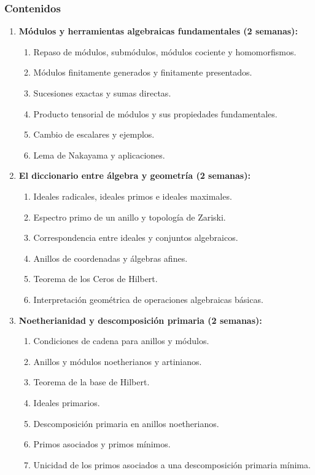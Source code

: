 \begin{refsection}
\subsubsection*{Contenidos}

\begin{enumerate}

\item \textbf{Módulos y herramientas algebraicas fundamentales (2 semanas):}
\begin{enumerate}
    \item Repaso de módulos, submódulos, módulos cociente y homomorfismos.
    \item Módulos finitamente generados y finitamente presentados.
    \item Sucesiones exactas y sumas directas.
    \item Producto tensorial de módulos y sus propiedades fundamentales.
    \item Cambio de escalares y ejemplos.
    \item Lema de Nakayama y aplicaciones.
\end{enumerate}

\item \textbf{El diccionario entre álgebra y geometría (2 semanas):}
\begin{enumerate}
    \item Ideales radicales, ideales primos e ideales maximales.
    \item Espectro primo de un anillo y topología de Zariski.
    \item Correspondencia entre ideales y conjuntos algebraicos.
    \item Anillos de coordenadas y álgebras afines.
    \item Teorema de los Ceros de Hilbert.
    \item Interpretación geométrica de operaciones algebraicas básicas.
\end{enumerate}

\item \textbf{Noetherianidad y descomposición primaria (2 semanas):}
\begin{enumerate}
    \item Condiciones de cadena para anillos y módulos.
    \item Anillos y módulos noetherianos y artinianos.
    \item Teorema de la base de Hilbert.
    \item Ideales primarios.
    \item Descomposición primaria en anillos noetherianos.
    \item Primos asociados y primos mínimos.
    \item Unicidad de los primos asociados a una descomposición primaria mínima.
\end{enumerate}


\end{enumerate}
\end{refsection}
